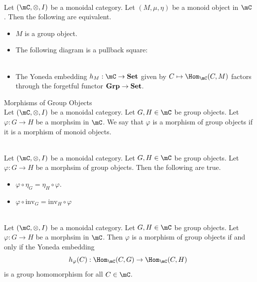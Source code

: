 \documentclass[a4paper]{article}
\begin{document}
\begin{prp}{}{}\\
Let $(\mC,\otimes,I)$ be a monoidal category. Let $(M,\mu,\eta)$ be a monoid object in $\mC$. Then the following are equivalent. 
\begin{itemize}
\item $M$ is a group object. 
\item The following diagram is a pullback square: \\
\\
\item The Yoneda embedding $h_M:\mC\to\bold{Set}$ given by $C\mapsto\Hom_\mC(C,M)$ factors through the forgetful functor $\bold{Grp}\to\bold{Set}$. 
\end{itemize}
\end{prp}

\begin{defn}{Morphisms of Group Objects}{}\\
Let $(\mC,\otimes,I)$ be a monoidal category. Let $G,H\in\mC$ be group objects. Let $\varphi:G\to H$ be a morphsim in $\mC$. We say that $\varphi$ is a morphism of group objects if it is a morphism of monoid objects. 
\end{defn}

\begin{lmm}{}{}\\
Let $(\mC,\otimes,I)$ be a monoidal category. Let $G,H\in\mC$ be group objects. Let $\varphi:G\to H$ be a morphsim of group objects. Then the following are true. 
\begin{itemize}
\item $\varphi\circ\eta_G=\eta_H\circ\varphi$. 
\item $\varphi\circ\text{inv}_G=\text{inv}_H\circ\varphi$
\end{itemize}
\end{lmm}

\begin{prp}{}{}\\
Let $(\mC,\otimes,I)$ be a monoidal category. Let $G,H\in\mC$ be group objects. Let $\varphi:G\to H$ be a morphsim in $\mC$. Then $\varphi$ is a morphism of group objects if and only if the Yoneda embedding $$h_\varphi(C):\Hom_\mC(C,G)\to\Hom_\mC(C,H)$$ is a  group homomorphism for all $C\in\mC$. 
\end{prp}
\end{document}
